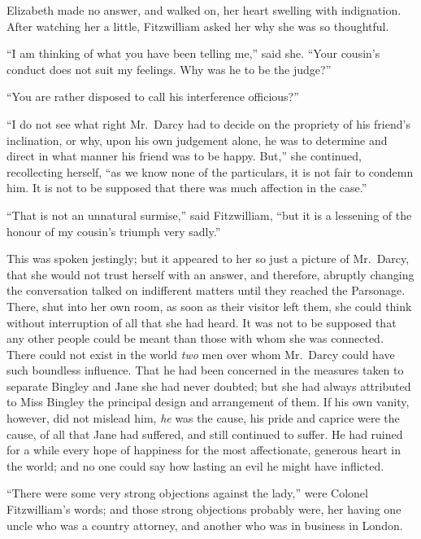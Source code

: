 \documentclass[12pt,english]{book}
\begin{document}
Elizabeth made no answer, and walked on, her heart swelling with indignation.
After watching her a little, Fitzwilliam asked her why she was so
thoughtful.

{}``I am thinking of what you have been telling me,'' said she.
{}``Your cousin's conduct does not suit my feelings. Why was he to
be the judge?''\ 

{}``You are rather disposed to call his interference officious?''\ 

{}``I do not see what right Mr.\ Darcy had to decide on the propriety
of his friend's inclination, or why, upon his own judgement alone,
he was to determine and direct in what manner his friend was to be
happy. But,'' she continued, recollecting herself, {}``as we know
none of the particulars, it is not fair to condemn him. It is not
to be supposed that there was much affection in the case.''

{}``That is not an unnatural surmise,'' said Fitzwilliam, {}``but
it is a lessening of the honour of my cousin's triumph very sadly.''

This was spoken jestingly; but it appeared to her so just a picture
of Mr.\ Darcy, that she would not trust herself with an answer, and
therefore, abruptly changing the conversation talked on indifferent
matters until they reached the Parsonage. There, shut into her own
room, as soon as their visitor left them, she could think without
interruption of all that she had heard. It was not to be supposed
that any other people could be meant than those with whom she was
connected. There could not exist in the world \textit{two} men over
whom Mr.\ Darcy could have such boundless influence. That he had
been concerned in the measures taken to separate Bingley and Jane
she had never doubted; but she had always attributed to Miss Bingley
the principal design and arrangement of them. If his own vanity, however,
did not mislead him, \textit{he} was the cause, his pride and caprice
were the cause, of all that Jane had suffered, and still continued
to suffer. He had ruined for a while every hope of happiness for the
most affectionate, generous heart in the world; and no one could say
how lasting an evil he might have inflicted.

{}``There were some very strong objections against the lady,'' were
Colonel Fitzwilliam's words; and those strong objections probably
were, her having one uncle who was a country attorney, and another
who was in business in London.
\end{document}

